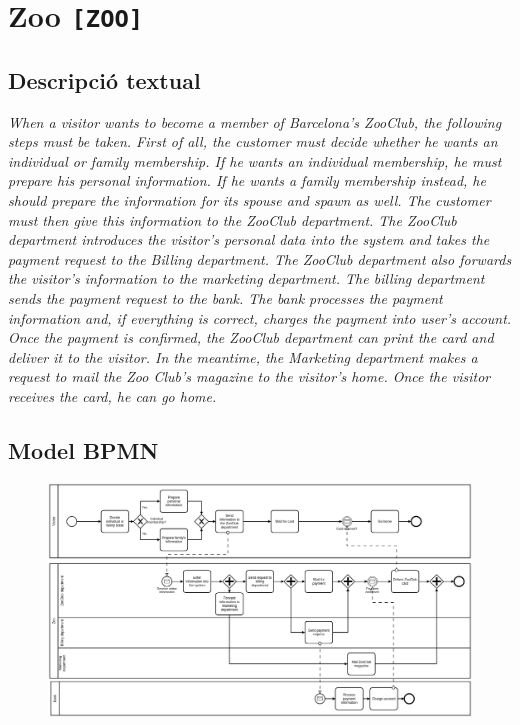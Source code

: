 \clearpage

\section{Zoo \texttt{[ZOO]}}
\label{sec:benchmark-zoo}

\subsection*{Descripció textual}

\textit{When a visitor wants to become a member of Barcelona's ZooClub, the following steps must be taken. First of all, the customer must decide whether he wants an individual or family membership. If he wants an individual membership, he must prepare his personal information. If he wants a family membership instead, he should prepare the information for its spouse and spawn as well. The customer must then give this information to the ZooClub department. The ZooClub department introduces the visitor's personal data into the system and takes the payment request to the Billing department. The ZooClub department also forwards the visitor's information to the marketing department. The billing department sends the payment request to the bank. The bank processes the payment information and, if everything is correct, charges the payment into user's account. Once the payment is confirmed, the ZooClub department can print the card and deliver it to the visitor. In the meantime, the Marketing department makes a request to mail the Zoo Club's magazine to the visitor's home. Once the visitor receives the card, he can go home.}

\subsection*{Model BPMN}

\begin{figure}[!h]
    \centering
    \includegraphics[width=\textwidth]{figures/benchmark/Zoo.png}
\end{figure}

